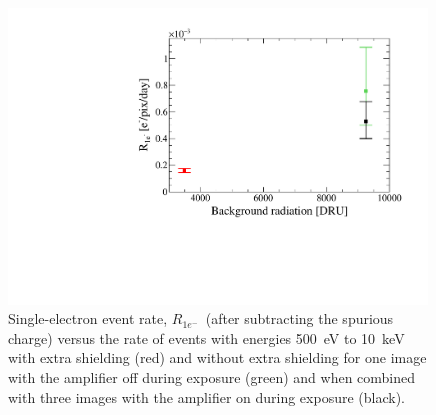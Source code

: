 \documentclass[aps,prl,twocolumn,showpacs,superscriptaddress,preprintnumbers]{revtex4-1}
\newcommand{\unit}[1]{\ensuremath{\mathrm{\,#1}}\xspace}
\newcommand{\e}{\unit{e^{-}}}
\newcommand{\Rs}{$R_{1e^-}$}
\newcommand{\Rtwo}{$R_{2e^-}$}
\begin{document}
\begin{figure}[t!]
\begin{center}
\includegraphics[width=0.99\textwidth]{Background_in.pdf}
\end{center}
\caption{Single-electron event rate, \Rs\ (after subtracting the spurious charge) versus the rate of events with energies 500~eV to 10~keV with extra shielding (red) and without extra shielding for one image with the amplifier off during exposure (green) and when combined with three images with the amplifier on during exposure (black). 
\vspace{-4mm}
}
\label{fig:Background}
\end{figure}

 
\end{document}
